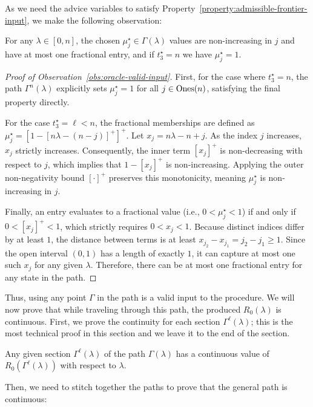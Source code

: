 As we need the advice variables to satisfy Property~\ref{property:admissible-frontier-input}, we make the following observation:
\begin{observation}\label{obs:oracle-valid-input}
    For any $\lambda \in [0,n]$, the chosen $\mu_j^\star\in\Gamma(\lambda)$ values are non-increasing in $j$ and have at most one fractional entry, and if $t_3^\star=n$ we have $\mu_j^\star=1$.
\end{observation}
\begin{proof}[Proof of Observation~\ref{obs:oracle-valid-input}]
    First, for the case where $t_3^\star = n$, the path $\Gamma^n(\lambda)$ explicitly sets $\mu_j^\star = 1$ for all $j \in \text{Ones}(n)$, satisfying the final property directly.

    For the case $t_3^\star = \ell < n$, the fractional memberships are defined as $\mu_j^\star = \left[1-\left[n\lambda - (n-j)\right]^+\right]^+$. Let $x_j = n\lambda - n + j$. As the index $j$ increases, $x_j$ strictly increases. Consequently, the inner term $[x_j]^+$ is non-decreasing with respect to $j$, which implies that $1 - [x_j]^+$ is non-increasing. Applying the outer non-negativity bound $[\cdot]^+$ preserves this monotonicity, meaning $\mu_j^\star$ is non-increasing in $j$.

    Finally, an entry evaluates to a fractional value (i.e., $0 < \mu_j^\star < 1$) if and only if $0 < [x_j]^+ < 1$, which strictly requires $0 < x_j < 1$. Because distinct indices differ by at least $1$, the distance between terms is at least $x_{j_2} - x_{j_1} = j_2 - j_1 \geq 1$. Since the open interval $(0, 1)$ has a length of exactly $1$, it can capture at most one such $x_j$ for any given $\lambda$. Therefore, there can be at most one fractional entry for any state in the path.
\end{proof}
Thus, using any point $\Gamma$ in the path is a valid input to the procedure.
We will now prove that while traveling through this path, the produced $R_0(\lambda)$ is continuous. First, we prove the continuity for each section $\Gamma^\ell(\lambda)$; this is the most technical proof in this section and we leave it to the end of the section.

\begin{lemma}\label{lem:oracle-continuous-section}
    Any given section $\Gamma^{\ell}(\lambda)$ of the path $\Gamma(\lambda)$ has a continuous value of $R_0(\Gamma^{\ell}(\lambda))$ with respect to $\lambda$.
\end{lemma}

Then, we need to stitch together the paths to prove that the general path is continuous:

